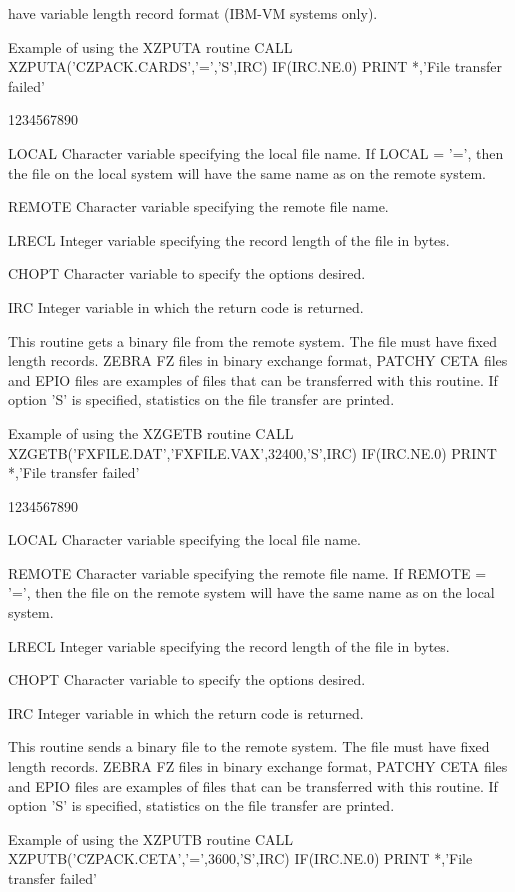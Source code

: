 have variable length record format (IBM-VM systems only).
\begin{XMPt}{Example of using the XZPUTA routine}
      CALL XZPUTA('CZPACK.CARDS','=','S',IRC)
      IF(IRC.NE.0) PRINT *,'File transfer failed'
\end{XMPt}
\begin{DLtt}{1234567890}
\item[LOCAL
]Character variable specifying the local file name.
If LOCAL = '=', then the file on the local system will
have the same name as on the remote system.
\item[REMOTE]Character variable specifying the remote file name.
\item[LRECL]Integer variable specifying the record length of the file in bytes.
\item[CHOPT]Character variable to specify the options desired.
\item[IRC]Integer variable in which the return code is returned.
\end{DLtt}
\par
This routine gets a binary file from the remote system.
The file must have fixed length records. ZEBRA FZ files in
binary exchange format, PATCHY CETA files and EPIO files
are examples of files that can be transferred with this routine.
If option 'S' is specified, statistics on the file transfer
are printed.
\begin{XMPt}{Example of using the XZGETB routine}
      CALL XZGETB('FXFILE.DAT','FXFILE.VAX',32400,'S',IRC)
      IF(IRC.NE.0) PRINT *,'File transfer failed'
\end{XMPt}
\begin{DLtt}{1234567890}
\item[LOCAL]Character variable specifying the local file name.
\item[REMOTE]Character variable specifying the remote file name.
If REMOTE = '=', then the file on the remote system will
have the same name as on the local system.
\item[LRECL]Integer variable specifying the record length of the file in bytes.
\item[CHOPT]Character variable to specify the options desired.
\item[IRC]Integer variable in which the return code is returned.
\end{DLtt}
\par
This routine sends a binary file to the remote system.
The file must have fixed length records. ZEBRA FZ files in
binary exchange format, PATCHY CETA files and EPIO files
are examples of files that can be transferred with this routine.
If option 'S' is specified, statistics on the file transfer
are printed.
\begin{XMPt}{Example of using the XZPUTB routine}
      CALL XZPUTB('CZPACK.CETA','=',3600,'S',IRC)
      IF(IRC.NE.0) PRINT *,'File transfer failed'
\end{XMPt}

